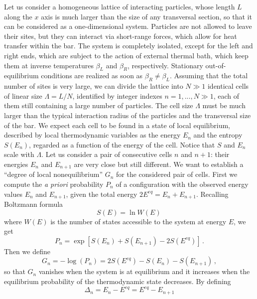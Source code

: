 \documentclass[iop, twocolumns, amssymb,notitlepage]{revtex4-1}
\newcommand{\indice}{n}
\begin{document}
Let us consider a homogeneous lattice of interacting particles, whose length $L$ 
along the $x$ axis is much larger than the size of any transversal section, so 
that it can be considered as a one-dimensional system. Particles are not allowed 
to leave their sites, but they can interact via short-range forces, which allow 
for heat transfer within the bar. The system is completely isolated, except for the 
left and right ends, which are subject to the action of external thermal bath,
which keep them at inverse temperatures $\beta_L$ and 
$\beta_R$, respectively. Stationary 
out-of-equilibrium conditions are realized as soon as $\beta_R \ne \beta_L$.  
Assuming that the total number of sites is very large, we can divide the lattice into 
$N\gg1$ identical cells of linear size $\Lambda=L/N$, identified by integer indexes 
$\indice=1,...,N\gg1$, each of them still containing a large number of particles. The 
cell size $\Lambda$ must be much larger than the typical interaction radius of 
the particles and the transversal size of the bar. We expect each cell to be 
found in a state of local equilibrium, described by local thermodynamic 
variables as the energy $E_\indice$ and the entropy $S(E_\indice)$, regarded as a function 
of the energy of the cell. Notice that $S$ and $E_\indice$ scale with $\Lambda$. Let 
us consider a pair of consecutive cells $\indice$ and $\indice+1$: their energies $E_\indice$ and 
$E_{\indice+1}$ are very close but still different. We want to establish a ``degree of 
local nonequilibrium'' $G_\indice$ for the considered pair of cells. First we compute 
the \textit{a priori} probability $P_\indice$ of a configuration with the observed 
energy values $E_\indice$ and $E_{\indice+1}$, given the total energy $2E^{eq}=E_\indice+E_{\indice+1}$. 
Recalling Boltzmann formula
\begin{equation}
 S(E)= \ln W(E)\,
\end{equation} 
where $W(E)$ is the number of states accessible to the system at energy $E$, we get
\begin{equation}
 P_\indice= \exp[S(E_\indice)+S(E_{\indice+1})-2S(E^{eq})]\,.
\end{equation} 
Then we define
\begin{equation}
\label{eq:gi}
 G_\indice=-\log(P_\indice)=2S(E^{eq})-S(E_\indice)-S(E_{\indice+1})\,,
\end{equation} 
so that $G_\indice$ vanishes when the system is at equilibrium and it increases when
the equilibrium probability of the thermodynamic state decreases. By defining \begin{equation}
 \Delta_\indice=E_\indice-E^{eq}=E^{eq}-E_{\indice+1}
\end{equation} 
\end{document}
